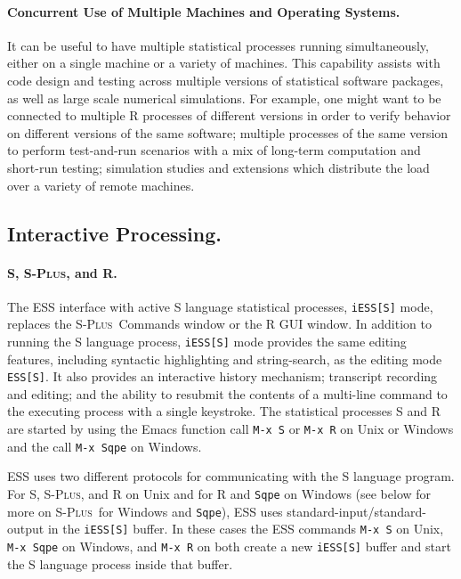 \documentclass{article}
\newcommand*{\Splus}{\textsc{S-Plus}}
\newcommand{\stexttt}[1]{{\small\texttt{#1}}}
\begin{document}
\paragraph{Concurrent Use of Multiple Machines and Operating Systems.}
\label{sec:conc-use-mult}

It can be useful to have multiple statistical processes running
simultaneously, either on a single machine or a variety of machines.
This capability assists with code design and testing across multiple
versions of statistical software packages, as well as large scale
numerical simulations.  For example, one might want to be connected to
multiple R processes of different versions in order to verify behavior
on different versions of the same software; multiple processes of the
same version to perform test-and-run scenarios with a mix of long-term
computation and short-run testing; simulation studies and extensions
which distribute the load over a variety of remote machines.

\subsection{Interactive Processing.}
\label{sec:interactive}

\paragraph{S, \Splus, and R.}
\label{sec:S:inf}

The ESS interface with active S language statistical processes,
\stexttt{iESS[S]} mode, replaces the \Splus\ Commands window or the R
GUI window.
In addition to running the S language process, \stexttt{iESS[S]} mode
provides the same editing features, including syntactic highlighting
and string-search, as the editing mode \stexttt{ESS[S]}.  It also
provides an interactive history mechanism; transcript recording and
editing; and the ability to resubmit the contents of a multi-line
command to the executing process with a single keystroke.  The
statistical processes S and R are started by using the Emacs function
call \stexttt{M-x~S} or \stexttt{M-x~R} on Unix or Windows and the
call \stexttt{M-x~Sqpe} on Windows.

ESS uses two different protocols for communicating with the S language
program.  For S, \Splus, and R on Unix and for R and \stexttt{Sqpe} on Windows
(see below for more on \Splus\ for Windows and \stexttt{Sqpe}), ESS uses
standard-input/standard-output in the \stexttt{iESS[S]} buffer.  In
these cases the ESS commands \stexttt{M-x~S} on Unix,
\stexttt{M-x~Sqpe} on Windows, and \stexttt{M-x~R} on both create a
new \stexttt{iESS[S]} buffer and start the S language process inside
that buffer.
\end{document}
